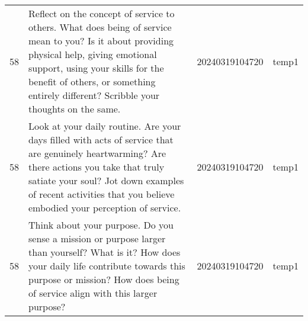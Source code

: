 \begin{longtable}{rlll}
 58 &                                                                                                                                                                                                                                                                                                                                                                                                                                                                                                                                                                                                                                                                                               Reflect on the concept of service to others. What does being of service mean to you? Is it about providing physical help, giving emotional support, using your skills for the benefit of others, or something entirely different? Scribble your thoughts on the same. & 20240319104720 &       temp1 \\
 58 &                                                                                                                                                                                                                                                                                                                                                                                                                                                                                                                                                                                                                                                                                                        Look at your daily routine. Are your days filled with acts of service that are genuinely heartwarming? Are there actions you take that truly satiate your soul? Jot down examples of recent activities that you believe embodied your perception of service. & 20240319104720 &       temp1 \\
 58 &                                                                                                                                                                                                                                                                                                                                                                                                                                                                                                                                                                                                                                                                                                                                        Think about your purpose. Do you sense a mission or purpose larger than yourself? What is it? How does your daily life contribute towards this purpose or mission? How does being of service align with this larger purpose? & 20240319104720 &       temp1 \\

\end{longtable}
